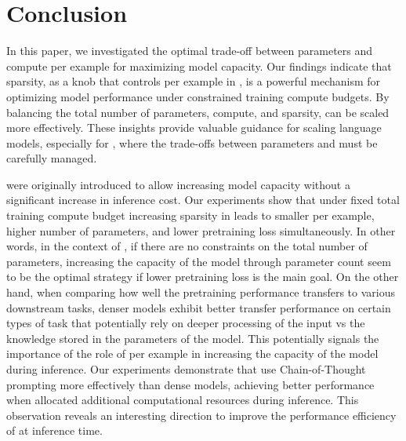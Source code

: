 \section{Conclusion}
In this paper, we investigated the optimal trade-off between parameters and compute per example for maximizing model capacity.
Our findings indicate that sparsity, as a knob that controls \flops per example in \moes, is a powerful mechanism for optimizing model performance under constrained training compute budgets. By balancing the total number of parameters, compute, and sparsity, \moes can be scaled more effectively. These insights provide valuable guidance for scaling language models, especially for \moes, where the trade-offs between parameters and \flops must be carefully managed.

\moes were originally introduced to allow increasing model capacity without a significant increase in inference cost. Our experiments show that under fixed total training compute budget increasing sparsity in \moes leads to smaller \flops per example, higher number of parameters, and lower pretraining loss simultaneously. In other words, in the context of \moes, if there are no constraints on the total number of parameters, increasing the capacity of the model through parameter count seem to be the optimal strategy if lower pretraining loss is the main goal. On the other hand, when comparing how well the pretraining performance transfers to various downstream tasks, denser models  exhibit better transfer performance on certain types of task that potentially rely on deeper processing of the input vs the knowledge stored in the parameters of the model. 
This potentially signals the importance of the role of \flops per example in increasing the capacity of the model during inference. 
Our experiments demonstrate that \moes use Chain-of-Thought prompting more effectively than dense models, achieving better performance when allocated additional computational resources during inference. 
This observation reveals an interesting direction to improve the performance efficiency of \moes at inference time.


